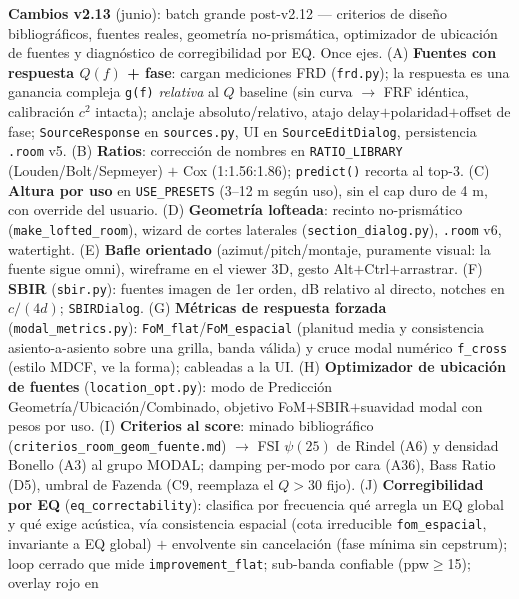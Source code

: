 \documentclass[11pt, a4paper]{article}
\begin{document}
\begin{center}
{    \textbf{Cambios v2.13} (junio): batch grande post-v2.12 --- criterios de
    diseño bibliográficos, fuentes reales, geometría no-prismática, optimizador
    de ubicación de fuentes y diagnóstico de corregibilidad por EQ. Once ejes.
    (A) \textbf{Fuentes con respuesta $Q(f)$ + fase}: cargan mediciones FRD
    (\texttt{frd.py}); la respuesta es una ganancia compleja \texttt{g(f)}
    \emph{relativa} al $Q$ baseline (sin curva $\to$ FRF idéntica, calibración
    $c^2$ intacta); anclaje absoluto/relativo, atajo delay$+$polaridad$+$offset
    de fase; \texttt{SourceResponse} en \texttt{sources.py}, UI en
    \texttt{SourceEditDialog}, persistencia \texttt{.room} v5.
    (B) \textbf{Ratios}: corrección de nombres en \texttt{RATIO\_LIBRARY}
    (Louden/Bolt/Sepmeyer) $+$ Cox (1:1.56:1.86); \texttt{predict()} recorta al
    top-3.
    (C) \textbf{Altura por uso} en \texttt{USE\_PRESETS} (3--12 m según uso), sin
    el cap duro de 4 m, con override del usuario.
    (D) \textbf{Geometría lofteada}: recinto no-prismático
    (\texttt{make\_lofted\_room}), wizard de cortes laterales
    (\texttt{section\_dialog.py}), \texttt{.room} v6, watertight.
    (E) \textbf{Bafle orientado} (azimut/pitch/montaje, puramente visual: la
    fuente sigue omni), wireframe en el viewer 3D, gesto Alt$+$Ctrl$+$arrastrar.
    (F) \textbf{SBIR} (\texttt{sbir.py}): fuentes imagen de 1er orden, dB
    relativo al directo, notches en $c/(4d)$; \texttt{SBIRDialog}.
    (G) \textbf{Métricas de respuesta forzada} (\texttt{modal\_metrics.py}):
    \texttt{FoM\_flat}/\texttt{FoM\_espacial} (planitud media y consistencia
    asiento-a-asiento sobre una grilla, banda válida) y cruce modal numérico
    \texttt{f\_cross} (estilo MDCF, ve la forma); cableadas a la UI.
    (H) \textbf{Optimizador de ubicación de fuentes}
    (\texttt{location\_opt.py}): modo de Predicción Geometría/Ubicación/Combinado,
    objetivo FoM$+$SBIR$+$suavidad modal con pesos por uso.
    (I) \textbf{Criterios al score}: minado bibliográfico
    (\texttt{criterios\_room\_geom\_fuente.md}) $\to$ FSI $\psi(25)$ de Rindel
    (A6) y densidad Bonello (A3) al grupo MODAL; damping per-modo por cara (A36),
    Bass Ratio (D5), umbral de Fazenda (C9, reemplaza el $Q>30$ fijo).
    (J) \textbf{Corregibilidad por EQ} (\texttt{eq\_correctability}): clasifica
    por frecuencia qué arregla un EQ global y qué exige acústica, vía consistencia
    espacial (cota irreducible \texttt{fom\_espacial}, invariante a EQ global) $+$
    envolvente sin cancelación (fase mínima sin cepstrum); loop cerrado que mide
    \texttt{improvement\_flat}; sub-banda confiable (ppw$\geq$15); overlay rojo en
}
\end{center}
\end{document}
